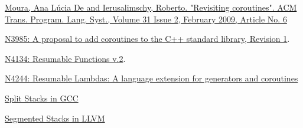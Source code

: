 \newpage
{}
\begin{thebibliography}{99}

        \href{http://www.inf.puc-rio.br/~roberto/docs/MCC15-04.pdf}
        {Moura, Ana L\'{u}cia De and Ierusalimschy, Roberto. "Revisiting coroutines".
         ACM Trans. Program. Lang. Syst., Volume 31 Issue 2, February 2009, Article No. 6}

        \href{http://www.open-std.org/jtc1/sc22/wg21/docs/papers/2014/n3985.pdf}
        {N3985: A proposal to add coroutines to the C++ standard library, Revision 1}.

        \href{http://www.open-std.org/jtc1/sc22/wg21/docs/papers/2014/n4134.pdf}
        {N4134: Resumable Functions v.2}.

        \href{http://www.open-std.org/jtc1/sc22/wg21/docs/papers/2014/n4244.pdf}
        {N4244: Resumable Lambdas: A language extension for generators and coroutines}

        \href{http://gcc.gnu.org/wiki/SplitStacks}
        {Split Stacks in GCC}

        \href{http://llvm.org/releases/3.0/docs/SegmentedStacks.html}
        {Segmented Stacks in LLVM}

\end{thebibliography}
